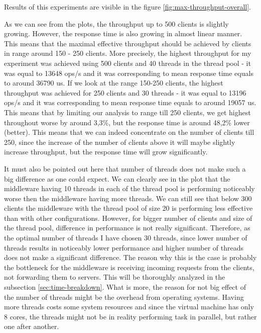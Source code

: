 \documentclass[11pt]{article}
\begin{document}
Results of this experiments are visible in the figure \ref{fig:max-throughput-overall}.

As we can see from the plots, the throughput up to 500 clients is slightly growing. However, the response time is also growing in almost linear manner. This means that the maximal effective throughput should be achieved by clients in range around 150 - 250 clients. More precisely, the highest throughput for my experiment was achieved using 500 clients and 40 threads in the thread pool - it was equal to 13648 ops/s and it was corresponding to mean response time equals to around 36790 us. If we look at the range 150-250 clients, the highest throughput was achieved for 250 clients and 30 threads - it was equal to 13196 ops/s and it was corresponding to mean response time equals to around 19057 us. This means that by limiting our analysis to range till 250 clients, we get highest throughout worse by around 3,3\%, but the response time is around 48,2\% lower (better). This means that we can indeed concentrate on the number of clients till 250, since the increase of the number of clients above it will maybe slightly increase throughput, but the response time will grow significantly.


It must also be pointed out here that number of threads does not make such a big difference as one could expect. We can clearly see in the plot that the middleware having 10 threads in each of the thread pool is performing noticeably worse then the middleware having more threads. We can still see that below 300 clients the middleware with the thread pool of size 20 is performing less effective than with other configurations. However, for bigger number of clients and size of the thread pool, difference in performance is not really significant. Therefore, as the optimal number of threads I have chosen 30 threads, since lower number of threads results in noticeably lower performance and higher number of threads does not make a significant difference. The reason why this is the case is probably the bottleneck for the middleware is receiving incoming requests from the clients, not forwarding them to servers. This will be thoroughly analyzed in the subsection \ref{sec:time-breakdown}. What is more, the reason for not big effect of the number of threads might be the overhead from operating systems. Having more threads costs some system resources and since the virtual machine has only 8 cores, the threads might not be in reality performing task in parallel, but rather one after another.
\end{document}

